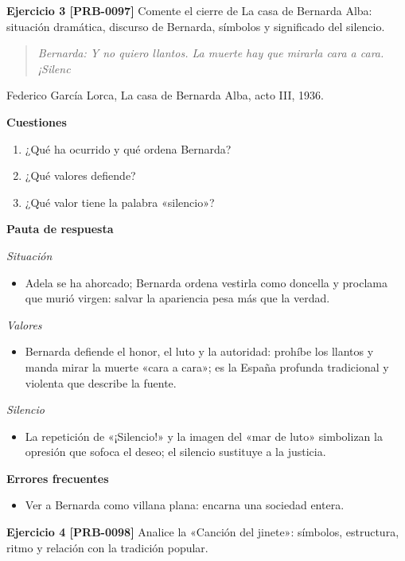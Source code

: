 \documentclass{book}
\begin{document}
\noindent\textbf{Ejercicio 3 [PRB-0097]}
Comente el cierre de La casa de Bernarda Alba: situación dramática, discurso de Bernarda, símbolos y significado del silencio.


\begin{quote}
\itshape Bernarda: Y no quiero llantos. La muerte hay que mirarla cara a cara. ¡Silenc
\end{quote}
{\noindent\footnotesize Federico García Lorca, La casa de Bernarda Alba, acto III, 1936.\par}

\noindent\textbf{Cuestiones}
\begin{enumerate}
\item ¿Qué ha ocurrido y qué ordena Bernarda?
\item ¿Qué valores defiende?
\item ¿Qué valor tiene la palabra «silencio»?
\end{enumerate}

\noindent\textbf{Pauta de respuesta}

\noindent\textit{Situación}
\begin{itemize}
\item Adela se ha ahorcado; Bernarda ordena vestirla como doncella y proclama que murió virgen: salvar la apariencia pesa más que la verdad.
\end{itemize}

\noindent\textit{Valores}
\begin{itemize}
\item Bernarda defiende el honor, el luto y la autoridad: prohíbe los llantos y manda mirar la muerte «cara a cara»; es la España profunda tradicional y violenta que describe la fuente.
\end{itemize}

\noindent\textit{Silencio}
\begin{itemize}
\item La repetición de «¡Silencio!» y la imagen del «mar de luto» simbolizan la opresión que sofoca el deseo; el silencio sustituye a la justicia.
\end{itemize}

\noindent\textbf{Errores frecuentes}
\begin{itemize}
\item Ver a Bernarda como villana plana: encarna una sociedad entera.
\end{itemize}

\noindent\textbf{Ejercicio 4 [PRB-0098]}
Analice la «Canción del jinete»: símbolos, estructura, ritmo y relación con la tradición popular.
\end{document}
